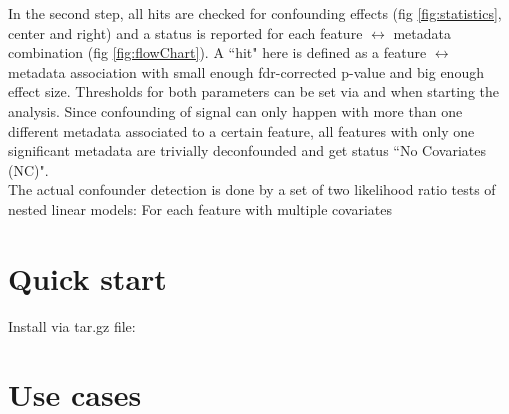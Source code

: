 \documentclass{article}\usepackage[]{graphicx}\usepackage[usenames,dvipsnames]{color}
\begin{document}
In the second step, all hits are checked for confounding effects (fig \ref{fig:statistics}, center and right) and a status is reported for each feature $\leftrightarrow$  metadata combination (fig \ref{fig:flowChart}). A ``hit" here is defined as a feature $\leftrightarrow$ metadata association with small enough fdr-corrected p-value and big enough  effect size. Thresholds for both parameters can be set via  and  when starting the analysis. Since confounding of signal can only happen with more than one different metadata associated to a certain feature, all features with only one significant metadata are trivially deconfounded and get status ``No Covariates (NC)". \\
The actual confounder detection is done by a set of two likelihood ratio tests of nested linear models: For each feature with multiple covariates
 
 

\section{Quick start}

Install via tar.gz file: 
%
%
%


%
\section{Use cases}
\end{document}
